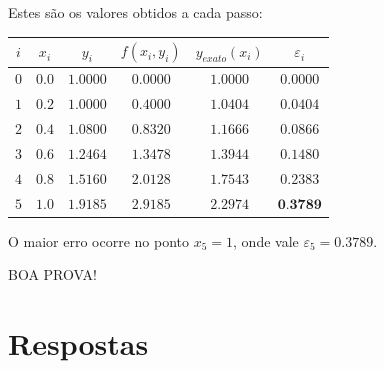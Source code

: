\documentclass[12pt,a4paper]{article}
\begin{document}
\begin{ExerciseList}
\Answer Estes são os valores obtidos a cada passo:
\begin{center}
\begin{tabular}{|c|c|c|c|c|c|}
\hline
$i$ & $x_i$ & $y_i$ & $f(x_i,y_i)$ & $y_{exato}(x_i)$ & $\varepsilon_i$ \\ \hline\hline
$0$ & $0.0$ & $1.0000$ & $0.0000$ & $1.0000$ & $0.0000$ \\ \hline
$1$ & $0.2$ & $1.0000$ & $0.4000$ & $1.0404$ & $0.0404$ \\ \hline
$2$ & $0.4$ & $1.0800$ & $0.8320$ & $1.1666$ & $0.0866$ \\ \hline
$3$ & $0.6$ & $1.2464$ & $1.3478$ & $1.3944$ & $0.1480$ \\ \hline
$4$ & $0.8$ & $1.5160$ & $2.0128$ & $1.7543$ & $0.2383$ \\ \hline
$5$ & $1.0$ & $1.9185$ & $2.9185$ & $2.2974$ & $\textbf{0.3789}$ \\ \hline
\end{tabular}
\end{center}
O maior erro ocorre no ponto $x_5 = 1$, onde vale $\varepsilon_5 = 0.3789$.
\end{ExerciseList}

\vspace{0.4cm}
\begin{center}
BOA PROVA!
\end{center}

\newpage
\restoregeometry
\section*{Respostas}
\shipoutAnswer
\end{document}
